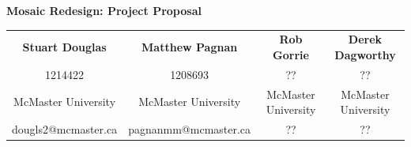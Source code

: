 \documentclass[10pt]{article}
\begin{document}
\begin{center}
{\LARGE \sffamily \textbf{Mosaic Redesign: Project Proposal} \vspace{2mm}}\\
\begin{tabular}{cccc}
\textbf{Stuart Douglas} & \textbf{Matthew Pagnan} & \textbf{Rob Gorrie} & \textbf{Derek Dagworthy}\\
1214422 & 1208693 & ?? & ??\\
McMaster University & McMaster University & McMaster University & McMaster University\\
dougls2@mcmaster.ca & pagnanmm@mcmaster.ca & ?? & ??\\
\end{tabular}
\end{center}
\vspace{2mm}
\end{document}
